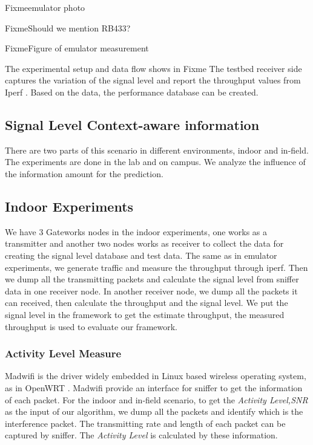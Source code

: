 Fixme{emulator photo}

Fixme{Should we mention RB433?}

Fixme{Figure of emulator measurement}

The experimental setup and data flow shows in Fixme %
The testbed receiver side captures the variation of the signal level and report the throughput values from Iperf \cite{Iperf}. Based on the data, 
the performance database can be created.


\subsection{Signal Level Context-aware information}
There are two parts of this scenario in different environments, indoor and in-field. The experiments are done in the lab and on campus. We analyze the influence of the information amount for the prediction. 
\subsection{Indoor Experiments}
We have 3 Gateworks nodes in the indoor experiments, one works as a transmitter and another two nodes works as receiver to collect the data for creating the signal level database and test data.
The same as in emulator experiments, we generate traffic and measure the throughput through iperf. Then we dump all the transmitting packets and calculate the signal level from sniffer data in one receiver node. 
In another receiver node, we dump all the packets it can received, then calculate the throughput and the signal level. We put the signal level in the framework to get the estimate throughput, the measured throughput is used to evaluate our framework.



\subsubsection{Activity Level Measure} 
Madwifi is the driver widely embedded in Linux based wireless operating system, as in OpenWRT \cite{Madwifi,Openwrt}. Madwifi provide an interface for sniffer to get the information of each packet.
For the indoor and in-field scenario,
to get the \emph{Activity Level,SNR} as the input of our algorithm, 
we dump all the packets and identify which is the interference packet. The transmitting rate and length of each packet can be captured by sniffer.
The \emph{Activity Level} is calculated by these information.


